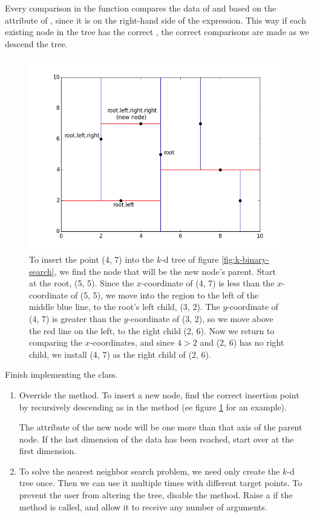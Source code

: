 Every comparison in the  function compares the data of  and  based on the  attribute of , since it is on the right-hand side of the expression.
This way if each existing node in the tree has the correct , the correct comparisons are made as we descend the tree.

\begin{figure}[H]
\includegraphics[width=\textwidth]{kdpic2.png}
\caption{To insert the point (4, 7) into the $k$-d tree of figure \ref{fig:k-binary-search}, we find the node that will be the new node's parent. Start at the root, (5, 5). Since the $x$-coordinate of (4, 7) is less than the $x$-coordinate of (5, 5), we move into the region to the left of the middle blue line, to the root's left child, (3, 2). The $y$-coordinate of (4, 7) is greater than the $y$-coordinate of (3, 2), so we move above the red line on the left, to the right child (2, 6). Now we return to comparing the $x$-coordinates, and since $4 > 2$ and (2, 6) has no right child, we install (4, 7) as the right child of (2, 6).}
\label{fig:k-insert}
\end{figure}

\begin{problem}
Finish implementing the  class.
\begin{enumerate}
\item Override the  method.
To insert a new node, find the correct insertion point by recursively descending as in the  method (ee figure \ref{fig:k-insert} for an example).

The  attribute of the new node will be one more than that axis of the parent node.
If the last dimension of the data has been reached, start over at the first dimension.

\item To solve the nearest neighbor search problem, we need only create the $k$-d tree once.
Then we can use it multiple times with different target points.
To prevent the user from altering the tree, disable the  method.
Raise a  if the method is called, and allow it to receive any number of arguments.
\end{enumerate}
\end{problem}

